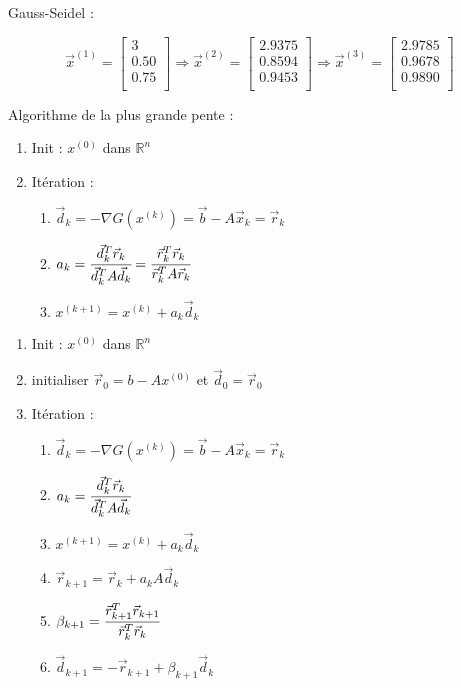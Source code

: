 Gauss-Seidel :

\[
\vec{x}^{(1)} = \begin{bmatrix}
    3 \\
    0.50 \\
    0.75 \\
\end{bmatrix}
\Rightarrow
\vec{x}^{(2)} = \begin{bmatrix}
    2.9375 \\
    0.8594 \\
    0.9453 \\
\end{bmatrix}
\Rightarrow
\vec{x}^{(3)} = \begin{bmatrix}
    2.9785 \\
    0.9678 \\
    0.9890 \\
\end{bmatrix}
\]


Algorithme de la plus grande pente :

\begin{enumerate}
    \item Init : $x^{(0)}$ dans $\mathbb{R}^n$
    \item Itération : 
        \begin{enumerate}
            \item $\vec{d}_k = - \nabla G(x^{(k)}) = \vec{b} -A\vec{x}_{k} = \vec{r}_k$
            \item $a_k = \cfrac{\vec{d}_k^T \vec{r}_k}{\vec{d}_k^T A \vec{d}_k} = \cfrac{\vec{r}_k^T \vec{r}_k}{\vec{r}_k^T A \vec{r}_k}$
            \item $x^{(k+1)} = x^{(k)} + a_k \vec{d}_k$
        \end{enumerate}
\end{enumerate}


\begin{enumerate}
    \item Init : $x^{(0)}$ dans $\mathbb{R}^n$
    \item initialiser $\vec{r}_0 = b - Ax^{(0)}$ et $\vec{d}_0 = \vec{r}_0$
    \item Itération : 
        \begin{enumerate}
            \item $\vec{d}_k = - \nabla G(x^{(k)}) = \vec{b} -A\vec{x}_{k} = \vec{r}_k$
            \item $a_k = \cfrac{\vec{d}_k^T \vec{r}_k}{\vec{d}_k^T A \vec{d}_k}$
            \item $x^{(k+1)} = x^{(k)} + a_k \vec{d}_k$
            \item $\vec{r}_{k+1} = \vec{r}_k + a_k A \vec{d}_k$
            \item $\beta_{k+1} = \cfrac{\vec{r}_{k+1}^T \vec{r}_{k+1}}{\vec{r}_k^T \vec{r}_k}$
            \item $\vec{d}_{k+1} = - \vec{r}_{k+1} + \beta_{k+1} \vec{d}_k$
        \end{enumerate}
\end{enumerate}